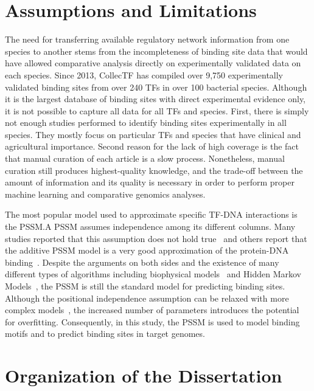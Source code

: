 \section{Assumptions and Limitations}

The need for transferring available regulatory network information from one
species to another stems from the incompleteness of binding site data that
would have allowed comparative analysis directly on experimentally validated
data on each species. Since 2013, CollecTF has compiled over 9,750
experimentally validated binding sites from over 240 TFs in over 100 bacterial
species. Although it is the largest database of binding sites with direct
experimental evidence only, it is not possible to capture all data for all TFs
and species. First, there is simply not enough studies performed to identify
binding sites experimentally in all species. They mostly focus on particular
TFs and species that have clinical and agricultural importance. Second reason
for the lack of high coverage is the fact that manual curation of each article
is a slow process. Nonetheless, manual curation still produces highest-quality
knowledge, and the trade-off between the amount of information and its quality
is necessary in order to perform proper machine learning and comparative
genomics analyses.

The most popular model used to approximate specific TF-DNA interactions is the
PSSM.\@ A PSSM assumes independence among its different columns. Many studies
reported that this assumption does not hold true~\cite{man2001non,
  bulyk2002nucleotides, tomovic2007position, osada2004comparative} and others
report that the additive PSSM model is a very good approximation of the
protein-DNA binding~\cite{benos2002additivity}. Despite the arguments on both
sides and the existence of many different types of algorithms including
biophysical models~\cite{stormo1998specificity, djordjevic2003biophysical} and
Hidden Markov Models~\cite{sinha2003probabilistic, drawid2009ohmm,
  salzberg1998microbial}, the PSSM is still the standard model for predicting
binding sites. Although the positional independence assumption can be relaxed
with more complex models~\cite{ben2005identification, zhao2012improved,
  siddharthan2010dinucleotide, barash2003modeling}, the increased number of
parameters introduces the potential for overfitting. Consequently, in this
study, the PSSM is used to model binding motifs and to predict binding sites in
target genomes.

\section{Organization of the Dissertation}

